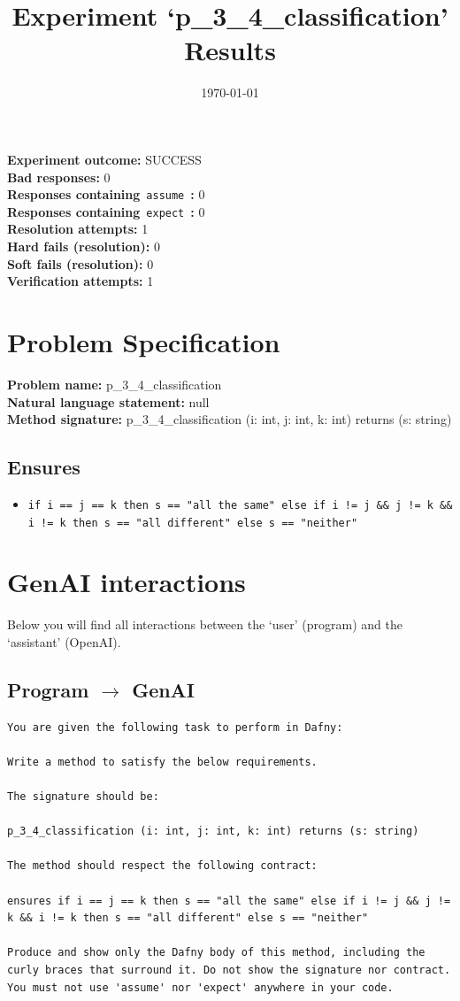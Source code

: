 \documentclass{article}
\begin{document}
\title{Experiment `p\_3\_4\_classification' Results}
\author{\today}
\date{}
\maketitle
\textbf{Experiment outcome: }SUCCESS
\\\textbf{Bad responses: }0
\\\textbf{Responses containing}~\texttt{assume}~\textbf{: }0
\\\textbf{Responses containing}~\texttt{expect}~\textbf{: }0
\\\textbf{Resolution attempts: }1
\\\textbf{Hard fails (resolution): }0
\\\textbf{Soft fails (resolution): }0
\\\textbf{Verification attempts: }1
\section*{Problem Specification}
\textbf{Problem name: }p\_3\_4\_classification
\\\textbf{Natural language statement: }null
\\\textbf{Method signature: }p\_3\_4\_classification (i: int, j: int, k: int) returns (s: string)
\subsection*{Ensures}
\begin{itemize}
\item \texttt{if i == j == k then s == "all the same" else if i != j \&\& j != k \&\& i != k then s == "all different" else s == "neither"}
\end{itemize}
\clearpage
\section*{GenAI interactions}
Below you will find all interactions between the `user' (program) and the `assistant' (OpenAI).
\subsection*{Program $\rightarrow$ GenAI}
\begin{lstlisting}
You are given the following task to perform in Dafny:

Write a method to satisfy the below requirements.

The signature should be:

p_3_4_classification (i: int, j: int, k: int) returns (s: string)

The method should respect the following contract:

ensures if i == j == k then s == "all the same" else if i != j && j != k && i != k then s == "all different" else s == "neither"

Produce and show only the Dafny body of this method, including the curly braces that surround it. Do not show the signature nor contract. You must not use 'assume' nor 'expect' anywhere in your code.
\end{lstlisting}
\end{document}
